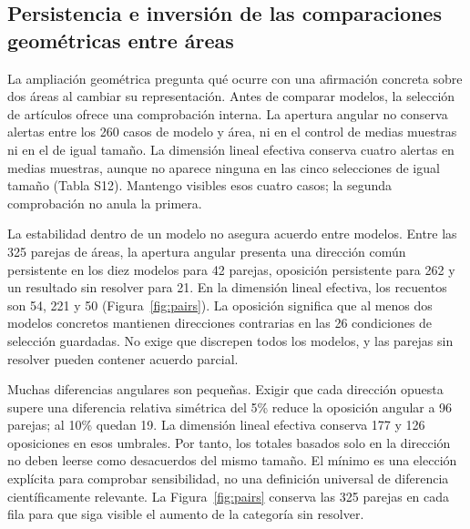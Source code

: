 \documentclass[12pt]{article}
\begin{document}
\subsection{Persistencia e inversión de las comparaciones geométricas entre áreas}
La ampliación geométrica pregunta qué ocurre con una afirmación concreta sobre dos áreas al cambiar su representación. Antes de comparar modelos, la selección de artículos ofrece una comprobación interna. La apertura angular no conserva alertas entre los 260 casos de modelo y área, ni en el control de medias muestras ni en el de igual tamaño. La dimensión lineal efectiva conserva cuatro alertas en medias muestras, aunque no aparece ninguna en las cinco selecciones de igual tamaño (Tabla S12). Mantengo visibles esos cuatro casos; la segunda comprobación no anula la primera.

La estabilidad dentro de un modelo no asegura acuerdo entre modelos. Entre las 325 parejas de áreas, la apertura angular presenta una dirección común persistente en los diez modelos para 42 parejas, oposición persistente para 262 y un resultado sin resolver para 21. En la dimensión lineal efectiva, los recuentos son 54, 221 y 50 (Figura~\ref{fig:pairs}). La oposición significa que al menos dos modelos concretos mantienen direcciones contrarias en las 26 condiciones de selección guardadas. No exige que discrepen todos los modelos, y las parejas sin resolver pueden contener acuerdo parcial.

Muchas diferencias angulares son pequeñas. Exigir que cada dirección opuesta supere una diferencia relativa simétrica del 5\% reduce la oposición angular a 96 parejas; al 10\% quedan 19. La dimensión lineal efectiva conserva 177 y 126 oposiciones en esos umbrales. Por tanto, los totales basados solo en la dirección no deben leerse como desacuerdos del mismo tamaño. El mínimo es una elección explícita para comprobar sensibilidad, no una definición universal de diferencia científicamente relevante. La Figura~\ref{fig:pairs} conserva las 325 parejas en cada fila para que siga visible el aumento de la categoría sin resolver.

\end{document}
